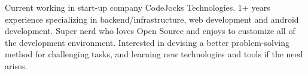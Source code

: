 

\begin{cvparagraph}

Current working in start-up company CodeJocks Technologies. 1+ years experience specializing in backend/infrastructure, web development and android development. Super nerd who loves Open Source and enjoys to customize all of the development environment. Interested in devising a better problem-solving method for challenging tasks, and learning new technologies and tools if the need arises.
\end{cvparagraph}
